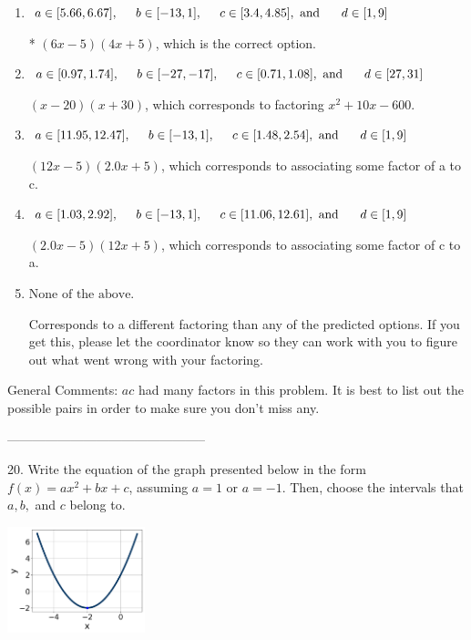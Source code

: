 \documentclass{article}[14pt]
\begin{document}
\begin{enumerate}[label=\Alph*.] 
\item $ a \in [5.66, 6.67], \hspace*{5mm} b \in [-13, 1], \hspace*{5mm} c \in [3.4, 4.85], \text{ and } \hspace*{5mm} d \in [1, 9] $ 

 * $(6x -5)(4x + 5)$, which is the correct option. 
\item $ a \in [0.97, 1.74], \hspace*{5mm} b \in [-27, -17], \hspace*{5mm} c \in [0.71, 1.08], \text{ and } \hspace*{5mm} d \in [27, 31] $ 

  $(x -20)(x + 30)$, which corresponds to factoring $x^{2} +10 x -600$. 
\item $ a \in [11.95, 12.47], \hspace*{5mm} b \in [-13, 1], \hspace*{5mm} c \in [1.48, 2.54], \text{ and } \hspace*{5mm} d \in [1, 9] $ 

  $(12x -5)(2.0x + 5)$, which corresponds to associating some factor of a to c. 
\item $ a \in [1.03, 2.92], \hspace*{5mm} b \in [-13, 1], \hspace*{5mm} c \in [11.06, 12.61], \text{ and } \hspace*{5mm} d \in [1, 9] $ 

  $(2.0x -5)(12x + 5)$, which corresponds to associating some factor of c to a. 
\item $ \text{None of the above.} $ 

  Corresponds to a different factoring than any of the predicted options. If you get this, please let the coordinator know so they can work with you to figure out what went wrong with your factoring. 
\end{enumerate} 
 
General Comments: $ac$ had many factors in this problem. It is best to list out the possible pairs in order to make sure you don't miss any.

-----------------------------------------------

20. Write the equation of the graph presented below in the form $f(x)=ax^2+bx+c$, assuming  $a=1$ or $a=-1$. Then, choose the intervals that $a, b,$ and $c$ belong to.
\begin{center} \includegraphics[width=0.3\textwidth]{../Figures/quadraticGraphToEquationC.png} \end{center} 
\end{document}
